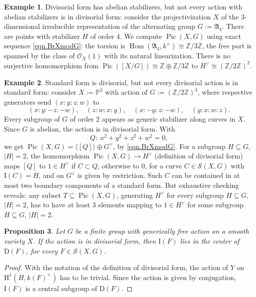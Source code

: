 \documentclass[12pt,reqno]{amsart}
\theoremstyle{plain}
\newtheorem{prop}{Proposition}[section]
\theoremstyle{remark}
\theoremstyle{definition}
\newtheorem{exam}[prop]{Example}
\numberwithin{equation}{section}
\newcommand{\bP}{{\mathbb P}}
\newcommand{\Z}{{\mathbb Z}}
\newcommand{\cO}{{\mathcal O}}
\newcommand{\fA}{{\mathfrak A}}
\newcommand{\rH}{{\mathrm H}}
\DeclareMathOperator{\Pic}{Pic}
\DeclareMathOperator{\Hom}{Hom}
\begin{document}
\begin{exam}
\label{exa.notdivisorial}
Divisorial form has abelian stabilizers, but not every action with abelian stabilizers is in divisorial form:
consider the 
projectivization $X$ of the $3$-dimensional irreducible representation of the alternating group $G:=\fA_4$.
There are points with stabilizer $H$ of order $4$.
We compute $\Pic(X,G)$ using exact sequence
\eqref{eqn.BrXmodG}:
the torsion is $\Hom(\fA_4,k^\times)\cong \Z/3\Z$, the free part is spanned by the class of $\cO_X(1)$ with its natural linearization.
There is no surjective homomorphism from
$\Pic([X/G])\cong \Z\oplus \Z/3\Z$
to
$H^\vee\cong (\Z/2\Z)^2$.
\end{exam}


\begin{exam}
\label{exa.notstandardform}
Standard form is divisorial, but not every divisorial action is in standard form:
consider $X:=\bP^3$ with action of
$G:=(\Z/2\Z)^4$, where respective generators send $(x:y:z:w)$ to
\[ (x:y:-z:-w),\quad
(z:w:x:y),\quad
(x:-y:z:-w),\quad
(y:x:w:z). \]
Every subgroup of $G$ of order $2$ appears as generic stabilizer along curves in $X$.
Since $G$ is abelian, the action is in divisorial form.
With
\[ Q:\ x^2+y^2+z^2+w^2=0, \]
we get $\Pic(X,G)=\langle[Q]\rangle\oplus G^\vee$, by \eqref{eqn.BrXmodG}.
For
a subgroup $H\subseteq G$, $|H|=2$, the homomorphism $\Pic(X,G)\to H^\vee$ (definition of divisorial form) maps $[Q]$ to $1\in H^\vee$ if $C\subset Q$, otherwise to $0$, for a curve $C\in \mathcal{S}(X,G)$ with $\mathrm{I}(C)=H$, and on $G^\vee$ is given by restriction.
Such $C$ can be contained in at most two boundary components of a standard form.
But exhaustive checking reveals: any subset $T\subseteq \Pic(X,G)$, generating $H^\vee$ for every subgroup $H\subseteq G$, $|H|=2$, has to have at least $3$ elements mapping to $1\in H^\vee$ for some subgroup $H\subseteq G$, $|H|=2$.
\end{exam}

\begin{prop}
\label{prop.divisorialcentral}
Let $G$ be a finite group with generically free action on a smooth variety $X$.
If the action is in divisorial form, then
$\mathrm{I}(F)$ lies in the center of $\mathrm{D}(F)$, for every
$F\in \mathcal{S}(X,G)$.
\end{prop}

\begin{proof}
With the notation of the definition of divisorial form, the action of $Y$ on $\rH^1(H,k(F)^\times)$ has to be trivial.
Since the action is given by conjugation,
$\mathrm{I}(F)$ is a central subgroup of $\mathrm{D}(F)$.
\end{proof}
\end{document}
